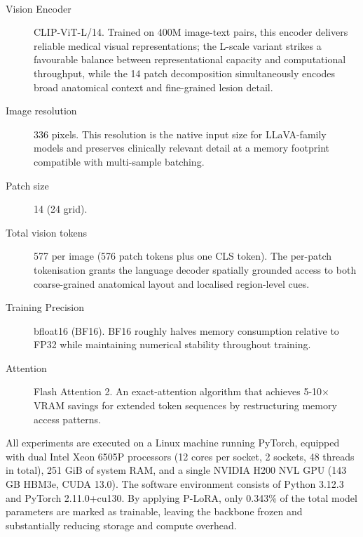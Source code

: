 ﻿﻿\documentclass[12pt]{report}
\begin{document}
\begin{description}
    \item[Vision Encoder] CLIP-ViT-L/14. Trained on 400M image-text pairs, this encoder delivers reliable medical visual representations; the L-scale variant strikes a favourable balance between representational capacity and computational throughput, while the 14 patch decomposition simultaneously encodes broad anatomical context and fine-grained lesion detail.
    \item[Image resolution] 336 pixels. This resolution is the native input size for LLaVA-family models and preserves clinically relevant detail at a memory footprint compatible with multi-sample batching.
    \item[Patch size] 14 (24 grid).
    \item[Total vision tokens] 577 per image (576 patch tokens plus one CLS token). The per-patch tokenisation grants the language decoder spatially grounded access to both coarse-grained anatomical layout and localised region-level cues.
    \item[Training Precision] bfloat16 (BF16). BF16 roughly halves memory consumption relative to FP32 while maintaining numerical stability throughout training.
    \item[Attention] Flash Attention 2. An exact-attention algorithm that achieves 5-10$\times$ VRAM savings for extended token sequences by restructuring memory access patterns.
\end{description}

All experiments are executed on a Linux machine running PyTorch, equipped with dual Intel Xeon 6505P processors (12 cores per socket, 2 sockets, 48 threads in total), 251 GiB of system RAM, and a single NVIDIA H200 NVL GPU (143 GB HBM3e, CUDA 13.0). The software environment consists of Python 3.12.3 and PyTorch 2.11.0+cu130. By applying P-LoRA, only 0.343\% of the total model parameters are marked as trainable, leaving the backbone frozen and substantially reducing storage and compute overhead.
\end{document}
